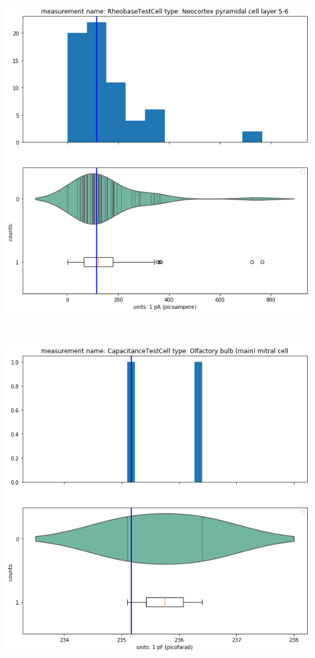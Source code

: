     \begin{center}
    \includegraphics[width=0.7\linewidth]{notebooks_converted/needata_thesis_files/needata_thesis_5_19}
    \end{center}
    { \hspace*{\fill} \\}
    
    \begin{center}
    \includegraphics[width=0.7\linewidth]{notebooks_converted/needata_thesis_files/needata_thesis_5_20}

\end{center}
    
